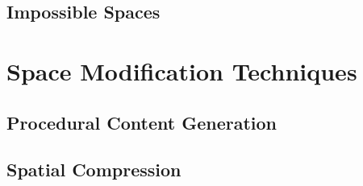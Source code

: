 \subsection{Impossible Spaces}
\label{sec:impossible-spaces}


\section{Space Modification Techniques}
\label{sec:spatial-techniques}

\subsection{Procedural Content Generation}
\label{sec:pcg}

\subsection{Spatial Compression}
\label{sec:spatial-compression}
